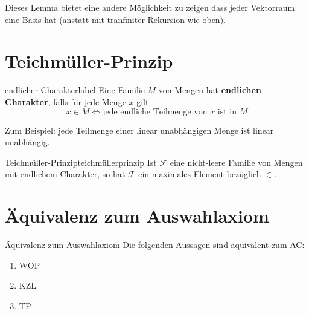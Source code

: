 \documentclass[12pt]{article}
\begin{document}
Dieses Lemma bietet eine andere Möglichkeit zu zeigen dass jeder Vektorraum eine Basis hat (anstatt mit tranfiniter Rekursion wie oben).


\section{Teichmüller-Prinzip}

\begin{definition}{endlicher Charakter}{label}
Eine Familie $M$ von Mengen hat \textbf{endlichen Charakter}, falls für jede Menge $x$ gilt: $$ x \in M \iff \text{jede endliche Teilmenge von } x \text{ ist in } M $$
\end{definition}

Zum Beispiel: jede Teilmenge einer linear unabhängigen Menge ist linear unabhängig.

\begin{definition}{Teichmüller-Prinzip}{teichmüllerprinzip}
Ist $\mathcal{F}$ eine nicht-leere Familie von Mengen mit endlichem Charakter, so hat $\mathcal{F}$ ein maximales Element bezüglich $\in$.
\end{definition}

\section{Äquivalenz zum Auswahlaxiom}

\begin{theorem}{Äquivalenz zum Auswahlaxiom}{}
    Die folgenden Aussagen sind äquivalent zum AC:
    \begin{enumerate}[label=\alph*)]
        \item WOP
        \item KZL
        \item TP
    \end{enumerate}
\end{theorem}
\end{document}
